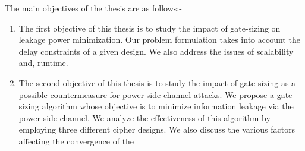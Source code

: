 The main objectives of the thesis are as follows:-
\begin{enumerate}
\item The first objective of this thesis is to study the impact of gate-sizing on leakage power minimization. Our problem formulation takes into account the delay constraints of a given design. We also address the issues of scalability and, runtime.

\item The second objective of this thesis is to study the impact of gate-sizing as a possible countermeasure for power side-channel attacks. We propose a gate-sizing algorithm whose objective is to minimize information leakage via the power side-channel. We analyze the effectiveness of this algorithm by employing three different cipher designs. We also discuss the various factors affecting the convergence of the 

\end{enumerate}